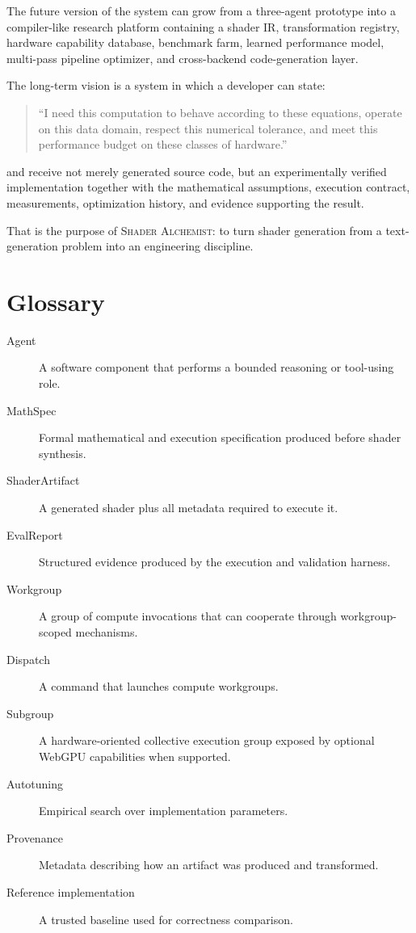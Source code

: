 \documentclass[11pt,a4paper,oneside]{report}
\newcommand{\SA}{\textsc{Shader Alchemist}}
\begin{document}
The future version of the system can grow from a three-agent prototype into a compiler-like
research platform containing a shader IR, transformation registry, hardware capability database,
benchmark farm, learned performance model, multi-pass pipeline optimizer, and cross-backend
code-generation layer.

The long-term vision is a system in which a developer can state:

\begin{quote}
``I need this computation to behave according to these equations, operate on this data domain,
respect this numerical tolerance, and meet this performance budget on these classes of hardware.''
\end{quote}

and receive not merely generated source code, but an experimentally verified implementation
together with the mathematical assumptions, execution contract, measurements, optimization
history, and evidence supporting the result.

That is the purpose of \SA{}: to turn shader generation from a text-generation problem into an
engineering discipline.

\appendix

\chapter{Glossary}

\begin{description}
  \item[Agent] A software component that performs a bounded reasoning or tool-using role.
  \item[MathSpec] Formal mathematical and execution specification produced before shader synthesis.
  \item[ShaderArtifact] A generated shader plus all metadata required to execute it.
  \item[EvalReport] Structured evidence produced by the execution and validation harness.
  \item[Workgroup] A group of compute invocations that can cooperate through workgroup-scoped
        mechanisms.
  \item[Dispatch] A command that launches compute workgroups.
  \item[Subgroup] A hardware-oriented collective execution group exposed by optional WebGPU
        capabilities when supported.
  \item[Autotuning] Empirical search over implementation parameters.
  \item[Provenance] Metadata describing how an artifact was produced and transformed.
  \item[Reference implementation] A trusted baseline used for correctness comparison.
\end{description}
\end{document}
